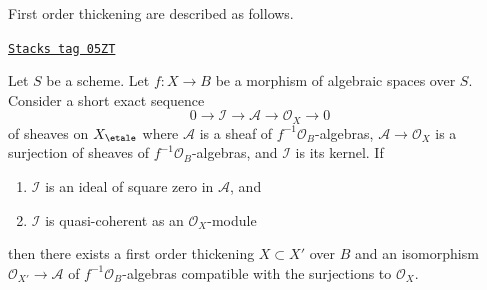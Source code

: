 First order thickening are described as follows.

\begin{lemma}
\label{spaces-more-morphisms-lemma-first-order-thickening}
\href{https://stacks.math.columbia.edu/tag/05ZT}{\texttt{Stacks tag 05ZT}}

Let $S$ be a scheme.
Let $f : X \to B$ be a morphism of algebraic spaces over $S$.
Consider a short exact sequence
$$
0 \to \mathcal{I} \to \mathcal{A} \to \mathcal{O}_X \to 0
$$
of sheaves on $X_\etale$ where $\mathcal{A}$ is a sheaf of
$f^{-1}\mathcal{O}_B$-algebras, $\mathcal{A} \to \mathcal{O}_X$ is a surjection
of sheaves of $f^{-1}\mathcal{O}_B$-algebras, and $\mathcal{I}$ is its kernel.
If
\begin{enumerate}
\item $\mathcal{I}$ is an ideal of square zero in $\mathcal{A}$, and
\item $\mathcal{I}$ is quasi-coherent as an $\mathcal{O}_X$-module
\end{enumerate}
then there exists a first order thickening
$X \subset X'$ over $B$ and an isomorphism
$\mathcal{O}_{X'} \to \mathcal{A}$ of $f^{-1}\mathcal{O}_B$-algebras
compatible with the surjections to $\mathcal{O}_X$.
\end{lemma}

